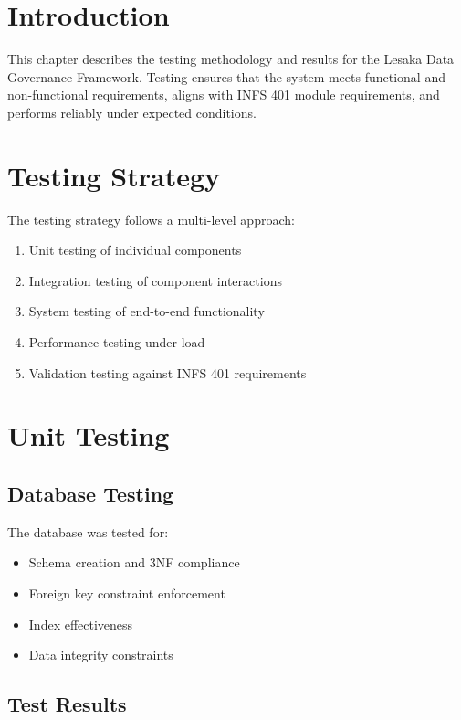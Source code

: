 
\section{Introduction}

This chapter describes the testing methodology and results for the Lesaka Data Governance Framework. Testing ensures that the system meets functional and non-functional requirements, aligns with INFS 401 module requirements, and performs reliably under expected conditions.

\section{Testing Strategy}

The testing strategy follows a multi-level approach:

\begin{enumerate}
    \item Unit testing of individual components
    \item Integration testing of component interactions
    \item System testing of end-to-end functionality
    \item Performance testing under load
    \item Validation testing against INFS 401 requirements
\end{enumerate}

\section{Unit Testing}

\subsection{Database Testing}

The database was tested for:

\begin{itemize}
    \item Schema creation and 3NF compliance
    \item Foreign key constraint enforcement
    \item Index effectiveness
    \item Data integrity constraints
\end{itemize}

\subsection{Test Results}

